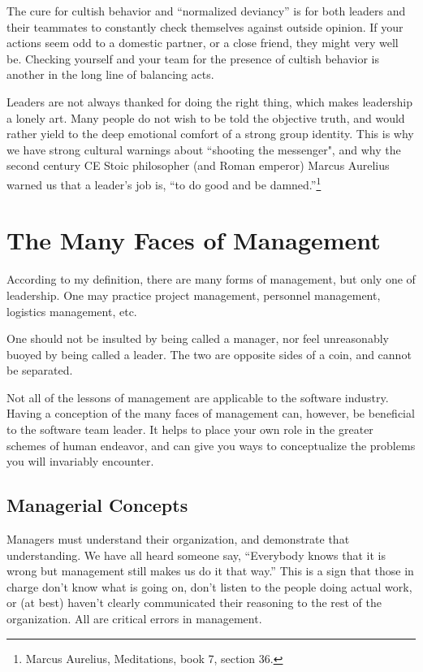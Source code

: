 The cure for cultish behavior and ``normalized deviancy'' is for both leaders and their teammates to constantly check themselves against outside opinion. If your actions seem odd to a domestic partner, or a close friend, they might very well be. Checking yourself and your team for the presence of cultish behavior is another in the long line of balancing acts. 

Leaders are not always thanked for doing the right thing, which makes leadership a lonely art. Many people do not wish to be told the objective truth, and would rather yield to the deep emotional comfort of a strong group identity. This is why we have strong cultural warnings about ``shooting the messenger", and why the second century CE Stoic philosopher (and Roman emperor) Marcus Aurelius warned us that a leader's job is, ``to do good and be damned.''\footnote{Marcus Aurelius, Meditations, book 7, section 36.}


\section{The Many Faces of Management}

According to my definition, there are many forms of management, but only one of leadership.  One may practice project management, personnel management, logistics management, etc.

One should not be insulted by being called a manager, nor feel unreasonably buoyed by being called a leader. The two are opposite sides of a coin, and cannot be separated.

Not all of the lessons of management are applicable to the software industry. Having a conception of the many faces of management can, however, be beneficial to the software team leader. It helps to place your own role in the greater schemes of human endeavor, and can give you ways to conceptualize the problems you will invariably encounter.


\subsection{Managerial Concepts}

Managers must understand their organization, and demonstrate that understanding.  We have all heard someone say, ``Everybody knows that it is wrong but management still makes us do it that way.''  This is a sign that those in charge don't know what is going on, don't listen to the people doing actual work, or (at best) haven't clearly communicated their reasoning to the rest of the organization.  All are critical errors in management.

